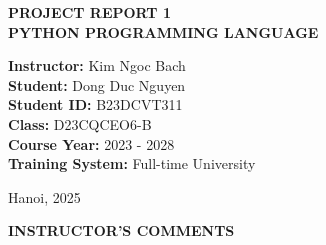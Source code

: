 \documentclass[12pt]{report}
\begin{document}
\begin{titlepage}
    \vspace{1cm}
{\Large \textbf{PROJECT REPORT 1}}\\[0.5cm] %
{\LARGE \textbf{PYTHON PROGRAMMING LANGUAGE}}\\ %
    \vfill
    \begin{flushleft}
    \hspace{2.5cm}\textbf{Instructor:} \hspace{2.85cm} Kim Ngoc Bach \\ %
    \hspace{2.5cm}\textbf{Student:} \hspace{3.3cm} Dong Duc Nguyen\\ %
    \hspace{2.5cm}\textbf{Student ID:} \hspace{2.7cm} B23DCVT311\\ %
   \hspace{2.5cm}\textbf{Class:} \hspace{3.9cm} D23CQCEO6-B\\ %
    \hspace{2.5cm}\textbf{Course Year:} \hspace{2.4cm} 2023 - 2028 \\ %
    \hspace{2.5cm}\textbf{Training System:} \hspace{1.6cm} Full-time University\\ %
    \end{flushleft}
    \vfill
    {\large Hanoi, 2025} %
\end{titlepage}
\clearpage
{}
\thispagestyle{empty}
\begin{center}
	{\textbf{\Large{INSTRUCTOR'S COMMENTS}}} %
\end{center}
\end{document}

